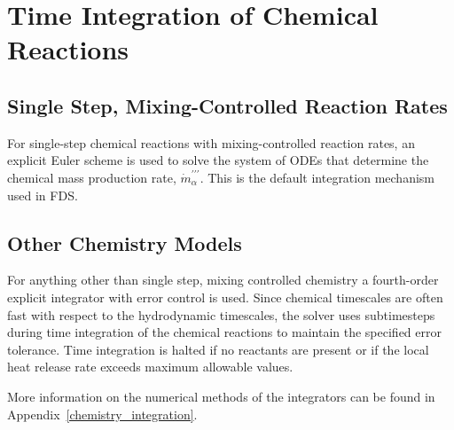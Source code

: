 \section{Time Integration of Chemical Reactions}

\subsection{Single Step, Mixing-Controlled Reaction Rates}
For single-step chemical reactions with mixing-controlled reaction rates, an explicit Euler scheme is used to solve the system of ODEs that determine the chemical mass production rate, $\dot{m}^{\prime\prime\prime}_{\alpha}$. This is the default integration mechanism used in FDS.

\subsection{Other Chemistry Models}

For anything other than single step, mixing controlled chemistry a fourth-order explicit integrator with error control is used.  Since chemical timescales are often fast with respect to the hydrodynamic timescales, the solver uses subtimesteps during time integration of the chemical reactions to maintain the specified error tolerance.  Time integration is halted if no reactants are present or if the local heat release rate exceeds maximum allowable values.

More information on the numerical methods of the integrators can be found in Appendix~\ref{chemistry_integration}.

